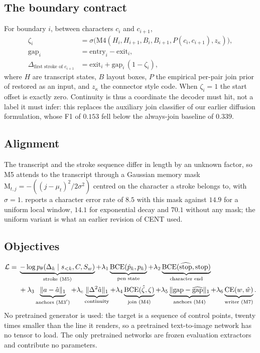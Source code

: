 \documentclass[conference]{IEEEtran}
\begin{document}
\subsection{The boundary contract}
For boundary $i$, between characters $c_i$ and $c_{i+1}$,
\begin{align}
\zeta_i &= \sigma\big(\mathrm{M4}(H_i,H_{i+1},B_i,B_{i+1},P(c_i,c_{i+1}),z_\kappa)\big),\\
\mathrm{gap}_i &= \mathrm{entry}_i-\mathrm{exit}_i,\\
\Delta_{\text{first stroke of }c_{i+1}} &= \mathrm{exit}_i+\mathrm{gap}_i\,(1-\zeta_i),
\end{align}
where $H$ are transcript states, $B$ layout boxes, $P$ the empirical per-pair join prior of
\cite{lin2007} restored as an input, and $z_\kappa$ the connector style code. When $\zeta_i=1$
the start offset is exactly zero. Continuity is thus a coordinate the decoder must hit, not a
label it must infer: this replaces the auxiliary join classifier of our earlier diffusion
formulation, whose F1 of $0.153$ fell below the always-join baseline of $0.339$.

\subsection{Alignment}
The transcript and the stroke sequence differ in length by an unknown factor, so M5 attends to
the transcript through a Gaussian memory mask $\mathrm{M}_{t,j}=-((j-\mu_t)^2/2\sigma^2)$ centred
on the character a stroke belongs to, with $\sigma=1$. \cite{trink} reports a character error
rate of $8.5$ with this mask against $14.9$ for a uniform local window, $14.1$ for exponential
decay and $70.1$ without any mask; the uniform variant is what an earlier revision of CENT used.

\subsection{Objectives}
\begin{align}
\mathcal{L} = {}& \underbrace{-\log p_\theta(\Delta_k\mid s_{<k},C,S_w)}_{\text{stroke (M5)}}
+ \lambda_1\underbrace{\mathrm{BCE}(\hat p_k,p_k)}_{\text{pen state}}
+ \lambda_2\underbrace{\mathrm{BCE}(\widehat{\mathrm{stop}}, \mathrm{stop})}_{\text{character end}}\notag\\
&+ \lambda_3\underbrace{\|a-\hat a\|_1}_{\text{anchors (M3$'$)}}
+ \lambda_c\underbrace{\|\Delta^2\hat a\|_1}_{\text{continuity}}
+ \lambda_4\underbrace{\mathrm{BCE}(\hat\zeta,\zeta)}_{\text{join (M4)}}
+ \lambda_5\underbrace{\|\mathrm{gap}-\widehat{\mathrm{gap}}\|_1}_{\text{anchors (M4)}}
+ \lambda_6\underbrace{\mathrm{CE}(w,\hat w)}_{\text{writer (M7)}} .
\end{align}
No pretrained generator is used: the target is a sequence of control points, twenty times
smaller than the line it renders, so a pretrained text-to-image network has no tensor to load.
The only pretrained networks are frozen evaluation extractors and contribute no parameters.
\end{document}
